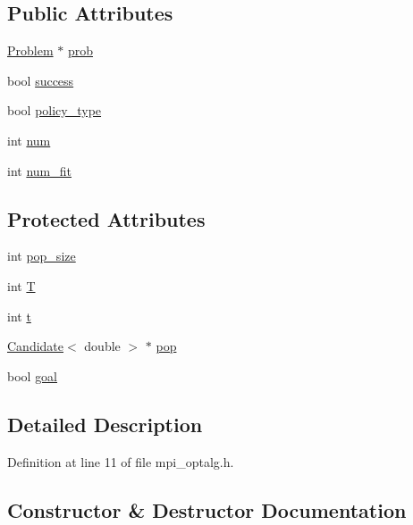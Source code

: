 \subsection*{Public Attributes}
\begin{DoxyCompactItemize}
\item 
\hyperlink{class_problem}{Problem} $\ast$ \hyperlink{class_opt_alg_ad83a3cc560bd483e499f26f629817f21}{prob}
\item 
bool \hyperlink{class_opt_alg_a2150acef11d441cb786afe578051e56f}{success}
\item 
bool \hyperlink{class_opt_alg_ad269f7018945be9bdd6fb0237fb73c74}{policy\+\_\+type}
\item 
int \hyperlink{class_opt_alg_a90c8e3ad1c547ae5a8ee572b8f5aec98}{num}
\item 
int \hyperlink{class_opt_alg_aad208e0441922169d0333c2277f1b7aa}{num\+\_\+fit}
\end{DoxyCompactItemize}
\subsection*{Protected Attributes}
\begin{DoxyCompactItemize}
\item 
int \hyperlink{class_opt_alg_a3e8052f94b8cbecfe087377cc5c9a530}{pop\+\_\+size}
\item 
int \hyperlink{class_opt_alg_a9cbac99eb4f69fb2a3860ecec0dd3dc3}{T}
\item 
int \hyperlink{class_opt_alg_a716972bd2e408aa4b77be28fa2f0cbb1}{t}
\item 
\hyperlink{class_candidate}{Candidate}$<$ double $>$ $\ast$ \hyperlink{class_opt_alg_ae3e61ddad0b8f9a7170167852828c292}{pop}
\item 
bool \hyperlink{class_opt_alg_adf188f99e90b0d81c699dd5e8da9d93a}{goal}
\end{DoxyCompactItemize}


\subsection{Detailed Description}


Definition at line 11 of file mpi\+\_\+optalg.\+h.



\subsection{Constructor \& Destructor Documentation}
\hypertarget{class_opt_alg_a43c2ab2d0561c3de89d1ecc65a81be23}{}
